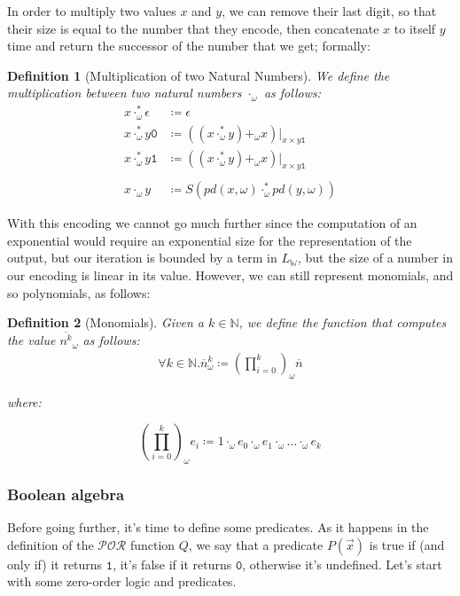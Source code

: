 \documentclass[10pt]{amsart}
\newcommand{\POR}{\mathcal{POR}}
\newcommand{\zero}{\mathtt{0}}
\newcommand{\one}{\mathtt{1}}
\newcommand{\vone}{x}
\newcommand{\vtwo}{y}
\newcommand{\none}{n}
\newcommand{\NN}{\mathbb{N}}
\newcommand{\oone}{\omega}
\newcommand{\pred}{pd}
\newtheorem{defn}{Definition}
\begin{document}
In order to multiply two values $\vone$ and $\vtwo$, we can remove their last digit, so that their size is equal to the number that they encode, then concatenate $\vone$ to itself $\vtwo$ time and return the successor of the number that we get; formally:
\begin{defn}[Multiplication of two Natural Numbers]

We define the multiplication between two natural numbers $\cdot_\oone$ as follows:
\begin{align*}
\vone \cdot_\oone^* \epsilon &\coloneqq \epsilon\\
\vone \cdot_\oone^* \vtwo\zero &\coloneqq ((\vone \cdot_\oone^* \vtwo) +_\oone \vone)|_{\vone \times \vtwo\one}\\
\vone \cdot_\oone^* \vtwo\one &\coloneqq ((\vone \cdot_\oone^* \vtwo) +_\oone \vone)|_{\vone \times \vtwo\one}\\\\
\vone \cdot_\oone \vtwo &\coloneqq S(\pred(\vone, \oone) \cdot_\oone^* \pred(\vtwo, \oone))
\end{align*}

\end{defn}
With this encoding we cannot go much further since the computation of an exponential would require an exponential size for the representation of the output, but our iteration is bounded by a term in $L_\mathbb{W}$, but the size of a number in our encoding is linear in its value. However, we can still represent monomials, and so polynomials, as follows:

\begin{defn}[Monomials]
Given a $k \in \NN$, we define the function that computes the value $\overline {n^k}_\oone$ as follows:
\begin{align*}
\forall k \in \NN. \overline \none_\oone^k \coloneqq (\prod_{i=0}^k)_\oone \overline \none
\end{align*}

where:

\[
(\prod_{i=0}^k)_\oone e_i \coloneqq 1 \cdot_\oone e_0 \cdot_\oone e_1 \cdot_\oone \ldots \cdot_\oone e_k
\]

\end{defn}
\subsubsection{Boolean algebra}
\label{sec:booleanalgebra}


Before going further, it's time to define some predicates. As it happens in the definition of the $\POR$ function $Q$, we say that a predicate \(P (\vec \vone)\) is true if (and only if) it returns \(\one\), it's false if it returns $\zero$, otherwise it's undefined. Let's start with some zero-order logic and predicates.
\end{document}
